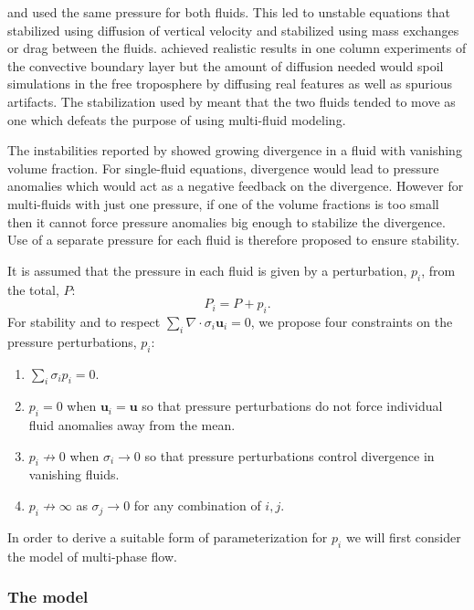 \documentclass[draft]{agujournal2019}
\begin{document}
 and 
used the same pressure for both fluids.
This led to unstable equations that 
stabilized using diffusion of vertical velocity and 
stabilized using mass exchanges or drag between the fluids. 
achieved realistic results in one column experiments of the convective
boundary layer but the amount of diffusion needed would spoil simulations
in the free troposphere by diffusing real features as well as spurious artifacts. The stabilization used by  meant
that the two fluids tended to move as one which defeats the purpose
of using multi-fluid modeling. 

The instabilities reported by  showed growing divergence
in a fluid with vanishing volume fraction. For single-fluid equations, divergence would lead to pressure anomalies which would act as a negative feedback on the divergence. However for multi-fluids with just one pressure, if one of the volume fractions is too small then it cannot force pressure anomalies big enough to stabilize the divergence. Use of a separate pressure for each fluid is therefore proposed to ensure stability.

It is assumed that the  pressure  in each fluid is given by a perturbation, $p_{i}$, from the total, $P$:
\begin{equation}
P_{i}=P+p_{i}.
\end{equation}
For stability and to respect $\sum_i \nabla\cdot\sigma_i\mathbf{u}_i=0$, we propose four constraints on the pressure perturbations, $p_i$:
\begin{enumerate}
\item $\sum_{i}\sigma_{i}p_{i}=0$.
\item $p_i=0$ when $\mathbf{u}_{i}=\mathbf{u}$ so that pressure perturbations do not force individual fluid anomalies away from the mean.
\item $p_i \not\to 0$ when $\sigma_i\to 0$ so that pressure perturbations control divergence in vanishing fluids.
\item $p_i\not\to\infty$ as $\sigma_j\to 0$ for any combination of $i,j$.
\end{enumerate}


In order to derive a suitable form of parameterization for $p_i$ we will first consider the  model of multi-phase flow.

\subsubsection{The \protect{} model}
\end{document}
